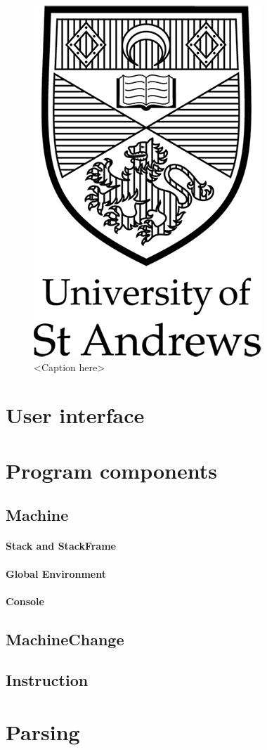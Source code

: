 \begin{figure}[htb]
\centering
\includegraphics[scale=0.3]{sta-logo} %
\caption{<Caption here>}
\label{fig:label} %
\end{figure}

\section{User interface}

\section{Program components}

\subsection{Machine}

\paragraph{Stack and StackFrame}

\paragraph{Global Environment}

\paragraph{Console}

\subsection{MachineChange}

\subsection{Instruction}

\section{Parsing}